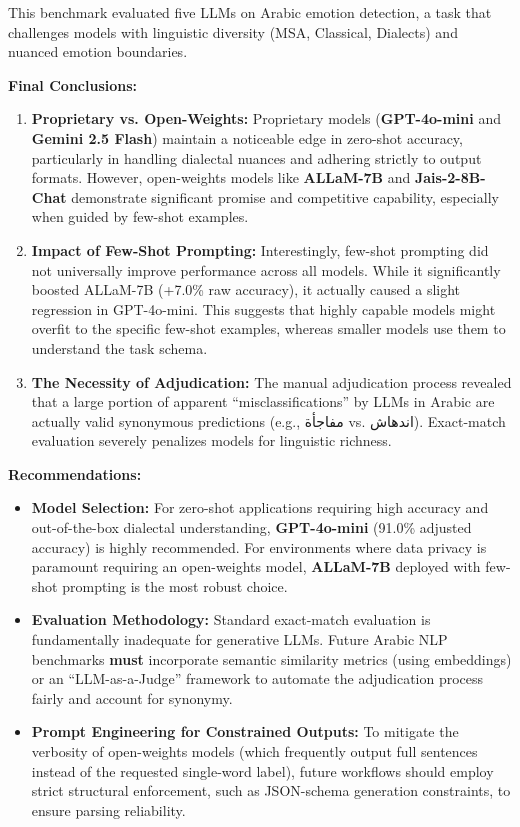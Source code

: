 This benchmark evaluated five LLMs on Arabic emotion detection, a task that challenges models with linguistic diversity (MSA, Classical, Dialects) and nuanced emotion boundaries. 

\textbf{Final Conclusions:}
\begin{enumerate}
    \item \textbf{Proprietary vs. Open-Weights:} Proprietary models (\textbf{GPT-4o-mini} and \textbf{Gemini 2.5 Flash}) maintain a noticeable edge in zero-shot accuracy, particularly in handling dialectal nuances and adhering strictly to output formats. However, open-weights models like \textbf{ALLaM-7B} and \textbf{Jais-2-8B-Chat} demonstrate significant promise and competitive capability, especially when guided by few-shot examples.
    \item \textbf{Impact of Few-Shot Prompting:} Interestingly, few-shot prompting did not universally improve performance across all models. While it significantly boosted ALLaM-7B (+7.0\% raw accuracy), it actually caused a slight regression in GPT-4o-mini. This suggests that highly capable models might overfit to the specific few-shot examples, whereas smaller models use them to understand the task schema.
    \item \textbf{The Necessity of Adjudication:} The manual adjudication process revealed that a large portion of apparent ``misclassifications'' by LLMs in Arabic are actually valid synonymous predictions (e.g., \textarabic{مفاجأة} vs. \textarabic{اندهاش}). Exact-match evaluation severely penalizes models for linguistic richness.
\end{enumerate}

\textbf{Recommendations:}
\begin{itemize}
    \item \textbf{Model Selection:} For zero-shot applications requiring high accuracy and out-of-the-box dialectal understanding, \textbf{GPT-4o-mini} (91.0\% adjusted accuracy) is highly recommended. For environments where data privacy is paramount requiring an open-weights model, \textbf{ALLaM-7B} deployed with few-shot prompting is the most robust choice.
    \item \textbf{Evaluation Methodology:} Standard exact-match evaluation is fundamentally inadequate for generative LLMs. Future Arabic NLP benchmarks \textbf{must} incorporate semantic similarity metrics (using embeddings) or an ``LLM-as-a-Judge'' framework to automate the adjudication process fairly and account for synonymy.
    \item \textbf{Prompt Engineering for Constrained Outputs:} To mitigate the verbosity of open-weights models (which frequently output full sentences instead of the requested single-word label), future workflows should employ strict structural enforcement, such as JSON-schema generation constraints, to ensure parsing reliability.
\end{itemize}

